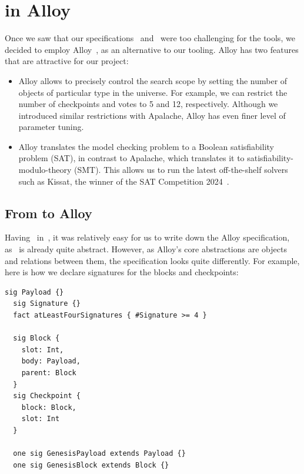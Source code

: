 
\section{\SpecThreeB{} in Alloy}\label{sec:alloy}

Once we saw that our specifications~\SpecThree{} and~\SpecFour{}
were too challenging for the \tlap{} tools, we decided to employ
Alloy~\cite{jackson2012software,alloytools}, as an alternative to our tooling.
Alloy has two features that are attractive for our project:

\begin{itemize}

  \item Alloy allows to precisely control the search scope by setting the
      number of objects of particular type in the universe. For example, we can
      restrict the number of checkpoints and votes to 5 and 12, respectively.
      Although we introduced similar restrictions with Apalache, Alloy has even
      finer level of parameter tuning.

  \item Alloy translates the model checking problem to a Boolean satisfiability
      problem (SAT), in contrast to Apalache, which translates it to satisfiability-modulo-theory (SMT).  This allows us to run the latest off-the-shelf solvers such as Kissat, the
      winner of the SAT Competition 2024~\cite{SAT-Competition-2024-solvers}.

\end{itemize}

\subsection{From \tlap{} to Alloy}

Having~\SpecThree{} in~\tlap{}, it was relatively easy for us to write down
the Alloy specification, as~\SpecThree{} is already quite abstract. However, as
Alloy's core abstractions are objects and relations between them, the
specification looks quite differently. For example, here is how we declare
signatures for the blocks and checkpoints:

\begin{lstlisting}[language=alloy,columns=fullflexible]
  sig Payload {}
  sig Signature {}
  fact atLeastFourSignatures { #Signature >= 4 }

  sig Block {
    slot: Int,
    body: Payload,
    parent: Block
  }
  sig Checkpoint {
    block: Block,
    slot: Int
  }

  one sig GenesisPayload extends Payload {}
  one sig GenesisBlock extends Block {}
\end{lstlisting}

